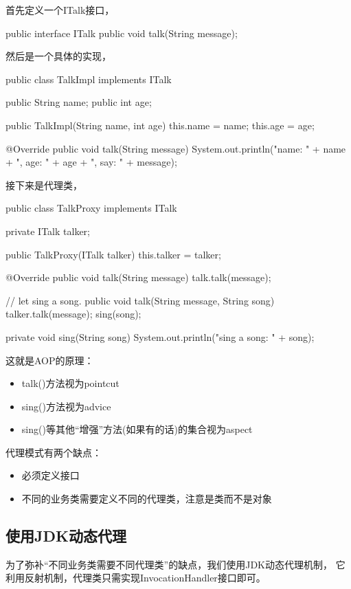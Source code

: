 \documentclass[a4paper,11pt]{article}
\begin{document}
首先定义一个ITalk接口，

\begin{javacode}
public interface ITalk {
  public void talk(String message);
}
\end{javacode}

然后是一个具体的实现，

\begin{javacode}
public class TalkImpl implements ITalk {
  public String name;
  public int age;

  public TalkImpl(String name, int age) {
    this.name = name;
    this.age = age;
  }

  @Override
  public void talk(String message) {
    System.out.println("name: " + name + ", age: " + age + ", say: " + message);
  }
}
\end{javacode}

接下来是代理类，

\begin{javacode}
public class TalkProxy implements ITalk {
  private ITalk talker;

  public TalkProxy(ITalk talker) {
    this.talker = talker;
  }

  @Override
  public void talk(String message) {
    talk.talk(message);
  }

  // let sing a song.
  public void talk(String message, String song) {
    talker.talk(message);
    sing(song);
  }

  private void sing(String song) {
    System.out.println("sing a song: " + song);
  }
}
\end{javacode}

这就是AOP的原理：
\begin{itemize}
\item talk()方法视为pointcut
\item sing()方法视为advice
\item sing()等其他“增强”方法(如果有的话)的集合视为aspect
\end{itemize}

代理模式有两个缺点：
\begin{itemize}
\item 必须定义接口
\item 不同的业务类需要定义不同的代理类，注意是类而不是对象
\end{itemize}

\subsection[使用JDK动态代理]{使用JDK动态代理}
为了弥补“不同业务类需要不同代理类”的缺点，我们使用JDK动态代理机制，
它利用反射机制，代理类只需实现InvocationHandler接口即可。
\end{document}

